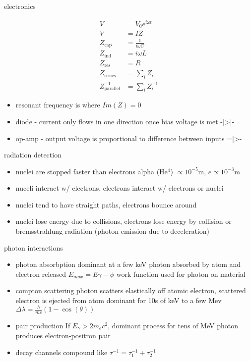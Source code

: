 \documentclass[avery5388, frame, grid]{flashcards}
\begin{document}
\begin{flashcard}{electronics}
  {
    \begin{align*}
      V &= V_{0}e^{i \omega t}\\
      V &= I Z\\
      Z_{\textrm{cap}} &= \frac{1}{i \omega C}\\
      Z_{\textrm{ind}} &= i \omega L\\
      Z_{\textrm{res}} &= R\\
      Z_{\textrm{series}} &= \sum_{i} Z_{i}\\
      Z_{\textrm{parallel}}^{-1} &= \sum_{i} Z_{i}^{-1}
    \end{align*}

    \begin{itemize}
    \item resonant frequency is where $Im(Z) = 0$
    \item diode - current only flows in one direction once bias voltage is met -|>|-
    \item op-amp - output voltage is proportional to difference between inputs =|>-
    \end{itemize}
  }
\end{flashcard}

\begin{flashcard}{radiation detection}
  {
    \begin{itemize}
    \item nuclei are stopped faster than electrons alpha (He$^{4}$) $\propto 10^{-5}$m, $e \propto 10^{-3}$m
    \item nuceli interact w/ electrons. electrons interact w/ electrons or nuclei
    \item nuclei tend to have straight paths, electrons bounce around
    \item nuclei lose energy due to collisions, electrons lose energy by collision or bremsstrahlung radiation (photon emission due to deceleration)
    \end{itemize}
  }
\end{flashcard}

\begin{flashcard}{photon interactions}
  {
    \begin{itemize}
    \item photon absorbption
      \subitem dominant at a few keV
      \subitem photon absorbed by atom and electron released
      \subitem $E_{max} = E \gamma - \phi$ work function used for photon on material
    \item compton scattering
      \subitem photon scatters elastically off atomic electron, scattered electron is ejected from atom
      \subitem dominant for 10s of keV to a few Mev
      \subitem $\Delta \lambda = \frac{h}{mc}(1 - \cos(\theta))$
    \item pair production
      \subitem If $E_{\gamma} > 2m_{e}c^{2}$, dominant process for tens of MeV
      \subitem photon produces electron-positron pair
    \item decay channels compound like $\tau^{-1} = \tau^{-1}_{1} + \tau^{-1}_{2}$
    \end{itemize}
  }
\end{flashcard}
\end{document}
